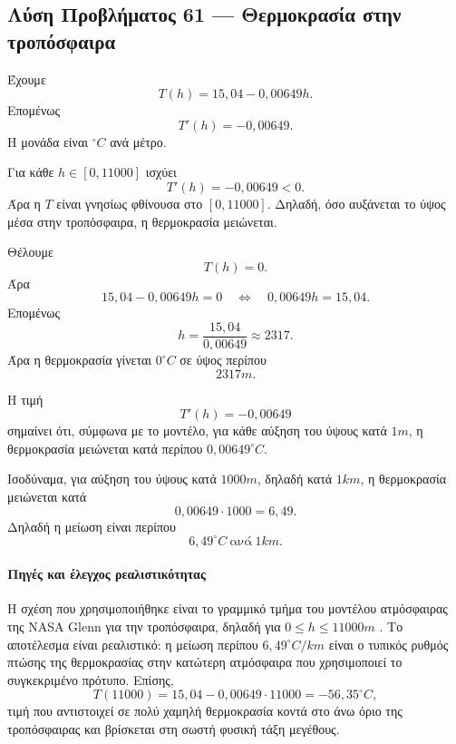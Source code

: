 \subsection*{Λύση Προβλήματος 61 --- Θερμοκρασία στην τροπόσφαιρα}

\begin{alist}
  \item Έχουμε
        \[
          T(h)=15{,}04-0{,}00649h.
        \]
        Επομένως
        \[
          {T'(h)=-0{,}00649}.
        \]
        Η μονάδα είναι \({}^\circ C\) ανά μέτρο.

  \item Για κάθε \(h\in[0,11000]\) ισχύει
        \[
          T'(h)=-0{,}00649<0.
        \]
        Άρα η \(T\) είναι γνησίως φθίνουσα στο \([0,11000]\).
        Δηλαδή, όσο αυξάνεται το ύψος μέσα στην τροπόσφαιρα, η
        θερμοκρασία μειώνεται.

  \item Θέλουμε
        \[
          T(h)=0.
        \]
        Άρα
        \[
          15{,}04-0{,}00649h=0
          \quad\Longleftrightarrow\quad
          0{,}00649h=15{,}04.
        \]
        Επομένως
        \[
          h=\frac{15{,}04}{0{,}00649}\approx2317.
        \]
        Άρα η θερμοκρασία γίνεται \(0^\circ C\) σε ύψος περίπου
        \[
          {2317\si{m}}.
        \]

  \item Η τιμή
        \[
          T'(h)=-0{,}00649
        \]
        σημαίνει ότι, σύμφωνα με το μοντέλο, για κάθε αύξηση του ύψους
        κατά \(1\si{m}\), η θερμοκρασία μειώνεται κατά περίπου
        \(0{,}00649^\circ C\).

        Ισοδύναμα, για αύξηση του ύψους κατά \(1000\si{m}\), δηλαδή
        κατά \(1\si{km}\), η θερμοκρασία μειώνεται κατά
        \[
          0{,}00649\cdot1000=6{,}49.
        \]
        Δηλαδή η μείωση είναι περίπου
        \[
          {6{,}49^\circ C\ \text{ανά}\ 1\si{km}}.
        \]
\end{alist}

\paragraph{Πηγές και έλεγχος ρεαλιστικότητας}
Η σχέση που χρησιμοποιήθηκε είναι το γραμμικό τμήμα του μοντέλου
ατμόσφαιρας της NASA Glenn για την τροπόσφαιρα, δηλαδή για
\(0\leq h\leq11000\si{m}\) \cite{nasaGlennEarthAtmosphereModel}.
Το αποτέλεσμα είναι ρεαλιστικό: η μείωση περίπου
\(6{,}49^\circ C/\si{km}\) είναι ο τυπικός ρυθμός πτώσης της
θερμοκρασίας στην κατώτερη ατμόσφαιρα που χρησιμοποιεί το συγκεκριμένο
πρότυπο. Επίσης,
\[
  T(11000)=15{,}04-0{,}00649\cdot11000=-56{,}35^\circ C,
\]
τιμή που αντιστοιχεί σε πολύ χαμηλή θερμοκρασία κοντά στο άνω όριο της
τροπόσφαιρας και βρίσκεται στη σωστή φυσική τάξη μεγέθους.
